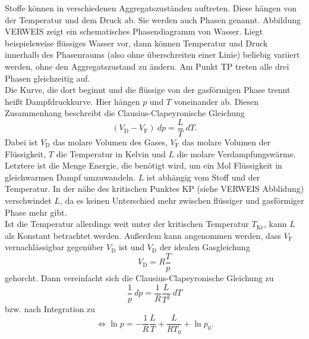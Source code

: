Stoffe können in verschiedenen Aggregatszuständen auftreten. Diese hängen von der Temperatur und dem Druck ab. Sie werden auch Phasen genannt. Abbildung VERWEIS zeigt ein schematisches Phasendiagramm von Wasser. Liegt beispielsweise flüssiges Wasser vor, dann können Temperatur und Druck innerhalb des Phasenraums (also ohne überschreiten einer Linie) beliebig variiert werden, ohne den Aggregatszustand zu ändern.
Am Punkt TP treten alle drei Phasen gleichzeitig auf. \\
Die Kurve, die dort beginnt und die flüssige von der gasförmigen Phase trennt heißt Dampfdruckkurve. Hier hängen $p$ und $T$ voneinander ab. Diesen Zusammenhang beschreibt die Clausius-Clapeyronische Gleichung
\begin{equation}\label{Clausius}
	(V_\text{D}-V_\text{F})\ dp = \frac{L}{T}\ dT.
\end{equation}
Dabei ist $V_\text{D}$ das molare Volumen des Gases, $V_\text{F}$ das molare Volumen der Flüssigkeit, $T$ die Temperatur in Kelvin und $L$ die molare Verdampfungswärme. \\
Letztere ist die Menge Energie, die benötigt wird, um ein Mol Flüssigkeit in gleichwarmen Dampf umzuwandeln. $L$ ist abhängig vom Stoff und der Temperatur. In der nähe des kritischen Punktes KP (siehe VERWEIS Abblidung) verschwindet $L$, da es keinen Unterschied mehr zwischen flüssiger und gasförmiger Phase mehr gibt. \\
Ist die Temperatur allerdings weit unter der kritischen Temperatur $T_\text{Kr}$, kann $L$ als Konstant betrachtet werden. Außerdem kann angenommen werden, dass $V_\text{F}$ vernachlässigbar gegenüber $V_\text{D}$ ist und $V_\text{D}$ der idealen Gasgleichung
\begin{equation}\label{ideales Gas}
	V_\text{D} = R\frac{T}{p}
\end{equation}
gehorcht. Dann vereinfacht sich die Clausius-Clapeyronische Gleichung zu
\begin{equation}\label{Clausius einfach}
	\frac{1}{p}\ dp = \frac{1}{R}\frac{L}{T^2}\ dT
\end{equation}
bzw. nach Integration zu
\begin{equation}\label{Regression ln(p)=1/T}
	\Leftrightarrow \ln p = - \frac{1}{R}\frac{L}{T} + \frac{L}{RT_0}+\ln p_0.
\end{equation}